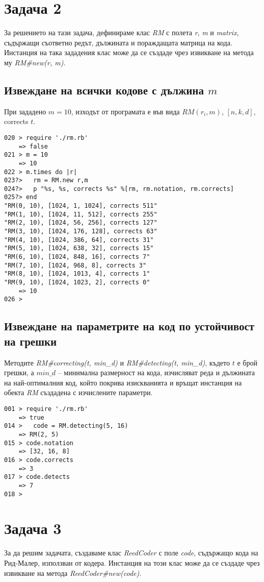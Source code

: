 \documentclass[a4paper,notitlepage,oneside]{report}
\begin{document}
\section{Задача 2}
За решението на тази задача, дефинираме клас \emph{RM} с полета \emph{r}, \emph{m} и \emph{matrix}, съдържащи съответно редът, дължината и пораждащата матрица на кода. Инстанция на така зададения клас може да се създаде чрез извикване на метода му \emph{RM\#new(r, m)}.

\subsection{Извеждане на всички кодове с дължина $m$}
При зададено $m=10$, изходът от програмата е във вида $RM(r_i,m)$, $\left[n, k, d \right]$, corrects $t$.
\begin{lstlisting}
020 > require './rm.rb'
    => false 
021 > m = 10
    => 10 
022 > m.times do |r|
023?>   rm = RM.new r,m
024?>   p "%s, %s, corrects %s" %[rm, rm.notation, rm.corrects] 
025?> end
"RM(0, 10), [1024, 1, 1024], corrects 511"
"RM(1, 10), [1024, 11, 512], corrects 255"
"RM(2, 10), [1024, 56, 256], corrects 127"
"RM(3, 10), [1024, 176, 128], corrects 63"
"RM(4, 10), [1024, 386, 64], corrects 31"
"RM(5, 10), [1024, 638, 32], corrects 15"
"RM(6, 10), [1024, 848, 16], corrects 7"
"RM(7, 10), [1024, 968, 8], corrects 3"
"RM(8, 10), [1024, 1013, 4], corrects 1"
"RM(9, 10), [1024, 1023, 2], corrects 0"
    => 10 
026 > 
\end{lstlisting}

\subsection{Извеждане на параметрите на код по устойчивост на грешки}
Методите \emph{RM\#correcting(t, min\_d)} и \emph{RM\#detecting(t, min\_d)}, където $t$ е брой грешки, а $min\_d$ -- минимална размерност на кода, изчисляват реда и дължината на най-оптималния код, който покрива изискванията и връщат инстанция на обекта \emph{RM} създадена с изчислените параметри. 

\begin{lstlisting}
001 > require './rm.rb'
    => true 
014 >   code = RM.detecting(5, 16)
    => RM(2, 5) 
015 > code.notation
    => [32, 16, 8] 
016 > code.corrects
    => 3 
017 > code.detects
    => 7 
018 >
\end{lstlisting}

\section{Задача 3}
За да решим задачата, създаваме клас \emph{ReedCoder} с поле \emph{code}, съдържащо кода на Рид-Малер, използван от кодера. Инстанция на този клас може да се създаде чрез извикване на метода \emph{ReedCoder\#new(code)}.
\end{document}
